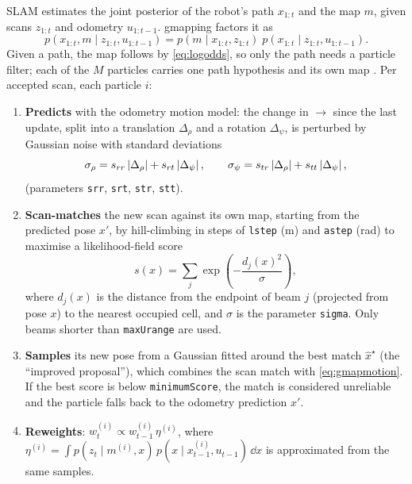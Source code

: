 SLAM estimates the joint posterior of the robot's path $x_{1:t}$ and the map
$m$, given scans $z_{1:t}$ and odometry $u_{1:t-1}$. gmapping
\cite{grisetti2007improved} factors it as
\begin{equation}\label{eq:rbpf}
p(x_{1:t},m\mid z_{1:t},u_{1:t-1}) =
p(m\mid x_{1:t},z_{1:t})\;p(x_{1:t}\mid z_{1:t},u_{1:t-1}).
\end{equation}
Given a path, the map follows by \eqref{eq:logodds}, so only the path needs a
particle filter; each of the $M$ particles carries one path hypothesis and
its own map \cite{doucet2000rao,murphy1999bayesian}. Per accepted scan, each
particle $i$:
\begin{enumerate}
\item \textbf{Predicts} with the odometry motion model: the change in
  $\to$ since the last update, split into a
  translation $\Delta_\rho$ and a rotation $\Delta_\psi$, is perturbed by
  Gaussian noise with standard deviations
\begin{equation}\label{eq:gmapmotion}
\sigma_\rho = s_{rr}\left\lvert \Delta_\rho \right\rvert + s_{rt}\left\lvert \Delta_\psi \right\rvert,\qquad
\sigma_\psi = s_{tr}\left\lvert \Delta_\rho \right\rvert + s_{tt}\left\lvert \Delta_\psi \right\rvert,
\end{equation}
  (parameters \texttt{srr}, \texttt{srt}, \texttt{str}, \texttt{stt}).
\item \textbf{Scan-matches} the new scan against its own map, starting from
  the predicted pose $x'$, by hill-climbing in steps of \texttt{lstep} (m) and
  \texttt{astep} (rad) to maximise a likelihood-field score
\begin{equation}\label{eq:gmapscore}
s(x) = \sum_{j}\exp\!\left(-\frac{d_j(x)^2}{\sigma}\right),
\end{equation}
  where $d_j(x)$ is the distance from the endpoint of beam $j$ (projected from
  pose $x$) to the nearest occupied cell, and $\sigma$ is the parameter
  \texttt{sigma}. Only beams shorter than \texttt{maxUrange} are used.
\item \textbf{Samples} its new pose from a Gaussian fitted around the best
  match $\hat x^\star$ (the ``improved proposal''), which combines the scan
  match with \eqref{eq:gmapmotion}. If the best score is below
  \texttt{minimumScore}, the match is considered unreliable and the
  particle falls back to the odometry prediction $x'$.
\item \textbf{Reweights}: $w^{(i)}_t \propto w^{(i)}_{t-1}\,\eta^{(i)}$, where
  $\eta^{(i)}=\int p(z_t\mid m^{(i)},x)\,p(x\mid x^{(i)}_{t-1},u_{t-1})\,\dd x$
  is approximated from the same samples.
\end{enumerate}
